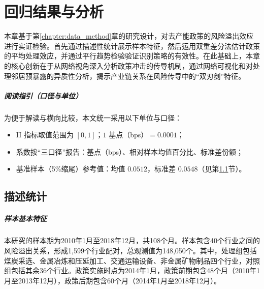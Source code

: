 \chapter{回归结果与分析}
\label{chap:empirical}



本章基于第\ref{chapter:data_method}章的研究设计，对去产能政策的风险溢出效应进行实证检验。首先通过描述性统计展示样本特征，然后运用双重差分法估计政策的平均处理效应，并通过平行趋势检验验证识别策略的有效性。在此基础上，本章的核心创新在于从网络视角深入分析政策冲击的传导机制，通过网络可视化和对处理邻居预暴露的异质性分析，揭示产业链关系在风险传导中的“双刃剑”特征。

\paragraph{阅读指引（口径与单位）}
为便于解读与横向比较，本文统一采用以下单位与口径：
\begin{itemize}
  \item II 指标取值范围为 $[0,1]$；$1$ 基点（bps）$=0.0001$；
  \item 系数按“三口径”报告：基点（bps）、相对样本均值百分比、标准差份额；
  \item 基准样本（5\%缩尾）参考值：均值 $0.0512$，标准差 $0.0548$（见第\ref{sec:descriptive}节）。
\end{itemize}



\section{描述统计}
\label{sec:descriptive}

\paragraph{样本基本特征}

本研究的样本期为2010年1月至2018年12月，共108个月。样本包含40个行业之间的风险溢出关系，形成1,599个行业配对，总观测值为148,050个。其中，处理组包括煤炭采选、金属冶炼和压延加工、交通运输设备、非金属矿物制品四个行业，对照组包括其余36个行业。政策实施时点为2014年1月，政策前期包含48个月（2010年1月至2013年12月），政策后期包含60个月（2014年1月至2018年12月）。

